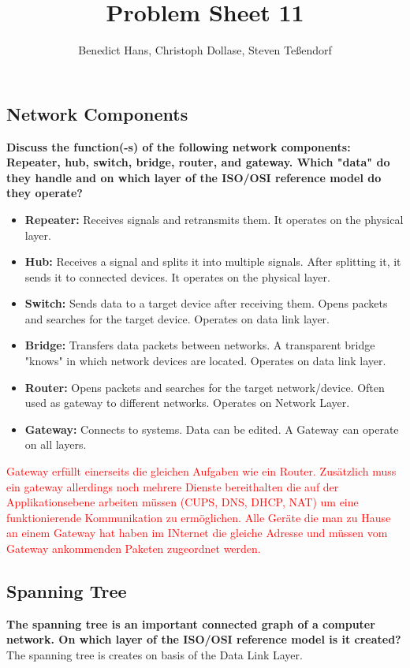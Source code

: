 \documentclass[a4paper,12pt]{article}
\author{Benedict Hans, Christoph Dollase, Steven Te\ss endorf}
\title{ \textbf{Problem Sheet 11}}
\newcommand*\red[1]{\textcolor{red}{#1}}
\begin{document}
	 
	\maketitle	 %
	
	\subsection{Network Components}
    \textbf{Discuss the function(-s) of the following network components: Repeater, hub, switch, bridge, router, 
    and gateway. Which "data" do they handle and on which layer of the ISO/OSI reference model do they operate?}
    \begin{itemize}[itemsep=0pt]
        \item \textbf{Repeater:} Receives signals and retransmits them. It operates on the physical layer.
        \item \textbf{Hub:} Receives a signal and splits it into multiple signals. After splitting it, it sends it
            to connected devices. It operates on the physical layer.
        \item \textbf{Switch:} Sends data to a target device after receiving them. Opens packets and searches for
            the target device. Operates on data link layer.
        \item \textbf{Bridge:} Transfers data packets between networks. A transparent bridge "knows" in which
            network devices are located. Operates on data link layer.
        \item \textbf{Router:} Opens packets and searches for the target network/device. Often used as gateway
            to different networks. Operates on Network Layer.
        \item \textbf{Gateway:} Connects to systems. Data can be edited. A Gateway can operate on all layers.
    \end{itemize}
    
    \red{Gateway erfüllt einerseits die gleichen Aufgaben wie ein Router.
    Zusätzlich muss ein gateway allerdings noch mehrere Dienste bereithalten
    die auf der Applikationsebene arbeiten müssen (CUPS, DNS, DHCP, NAT) um
    eine funktionierende Kommunikation zu ermöglichen.
    Alle Geräte die man zu Hause an einem Gateway hat haben im INternet die 
    gleiche Adresse und müssen vom Gateway ankommenden Paketen zugeordnet
    werden.}
	
	
	\subsection{Spanning Tree}
	\textbf{The spanning tree is an important connected graph of a computer network. On which layer of the ISO/OSI
    reference model is it created?} \newline
    The spanning tree is creates on basis of the Data Link Layer. \newline
    \newline
\end{document}
